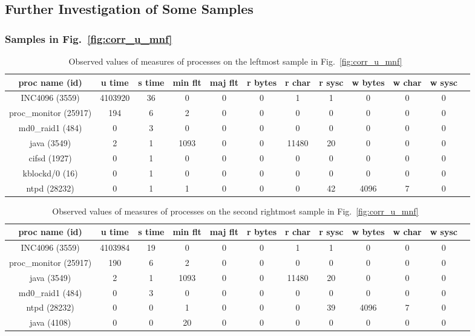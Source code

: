\clearpage

\subsection{Further Investigation of Some Samples}

\subsubsection{Samples in Fig.~\ref{fig:corr_u_mnf}}

\begin{table}[h]
\begin{center}
\begin{tabular}{|c|c|c|c|c|c|c|c|c|c|c|c|} \hline
proc name (id) & u time & s time & min flt & maj flt & r bytes & r char & r sysc & w bytes & w char & w sysc\\ \hline
INC4096 (3559) & 4103920 & 36 & 0 & 0 & 0 & 1 & 1 & 0 & 0 & 0 \\ \hline
proc\_monitor (25917) & 194 & 6 & 2 & 0 & 0 & 0 & 0 & 0 & 0 & 0 \\ \hline
md0\_raid1 (484) & 0 &  3 & 0 & 0 & 0 & 0 & 0 & 0 & 0 & 0 \\ \hline
java (3549) & 2 & 1 & 1093 & 0 & 0 & 11480 & 20 & 0 & 0 & 0 \\ \hline
cifsd (1927) & 0 & 1 & 0 & 0 & 0 & 0 & 0 & 0 & 0 & 0 \\ \hline
kblockd/0 (16) & 0 & 1 & 0 & 0 & 0 & 0 & 0 & 0 & 0 & 0 \\ \hline
ntpd (28232) & 0 & 1 & 1 & 0 & 0 & 0 & 42 & 4096 & 7 & 0 \\ \hline
\end{tabular}
\end{center}
\caption{Observed values of measures of processes on the leftmost sample in Fig.~\ref{fig:corr_u_mnf}~\label{tab:breakdown}}
\end{table}

\begin{table}[h]
\begin{center}
\begin{tabular}{|c|c|c|c|c|c|c|c|c|c|c|c|} \hline
proc name (id) & u time & s time & min flt & maj flt & r bytes & r char & r sysc & w bytes & w char & w sysc\\ \hline
INC4096 (3559) & 4103984 & 19 & 0 & 0 & 0 & 1 & 1 & 0 & 0 & 0 \\ \hline
proc\_monitor (25917) & 190 & 6 & 2 & 0 & 0 & 0 & 0 & 0 & 0 & 0 \\ \hline
java (3549) & 2 & 1 & 1093 & 0 & 0 & 11480 & 20 & 0 & 0 & 0 \\ \hline
md0\_raid1 (484) & 0 & 3 & 0 & 0 & 0 & 0 & 0 & 0 & 0 & 0 \\ \hline
ntpd (28232) & 0 & 0 & 1 & 0 & 0 & 0 & 39 & 4096 & 7 & 0 \\ \hline
java (4108) & 0 & 0  & 20 & 0 & 0 & 0 & 0 & 0 & 0 & 0 \\ \hline
\end{tabular}
\end{center}
\caption{Observed values of measures of processes on the second rightmost sample in Fig.~\ref{fig:corr_u_mnf}~\label{tab:breakdown2}}
\end{table}

